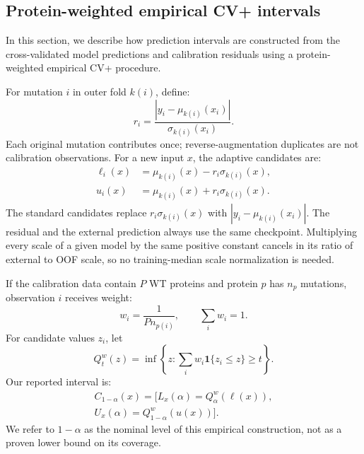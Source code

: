 \documentclass[11pt]{article}
\begin{document}
\subsection{Protein-weighted empirical CV+ intervals}

In this section, we describe how prediction intervals are constructed from the
cross-validated model predictions and calibration residuals using a
protein-weighted empirical CV+ procedure.

For mutation $i$ in outer fold $k(i)$, define:
\begin{equation}
r_i=\frac{|y_i-\mu_{k(i)}(x_i)|}{\sigma_{k(i)}(x_i)}.
\end{equation}
Each original mutation contributes once; reverse-augmentation duplicates are not calibration
observations. For a new input $x$, the adaptive candidates are:
\begin{align}
\ell_i(x)&=\mu_{k(i)}(x)-r_i\sigma_{k(i)}(x),\\
u_i(x)&=\mu_{k(i)}(x)+r_i\sigma_{k(i)}(x).
\end{align}
The standard candidates replace $r_i\sigma_{k(i)}(x)$ with $|y_i-\mu_{k(i)}(x_i)|$.
The residual and the external prediction always use the same checkpoint. Multiplying every
scale of a given model by the same positive constant cancels in its ratio of external to OOF
scale, so no training-median scale normalization is needed.

If the calibration data contain $P$ WT proteins and protein $p$ has $n_p$ mutations,
observation $i$ receives weight:
\begin{equation}
w_i=\frac{1}{P n_{p(i)}},\qquad \sum_iw_i=1.
\end{equation}
For candidate values $z_i$, let
\begin{equation}
Q^w_t(z)=\inf\left\{z:\sum_i w_i\mathbf 1\{z_i\leq z\}\geq t\right\}.
\end{equation}
Our reported interval is:
\begin{equation}
  \begin{split}
    C_{1-\alpha}(x)=
    [L_x(\alpha)=Q^w_{\alpha}(\ell(x)),\\ U_x(\alpha)=Q^w_{1-\alpha}(u(x))].
  \end{split}
\end{equation}
We refer to $1-\alpha$ as the nominal level of
this empirical construction, not as a proven lower bound on its coverage.
\end{document}

